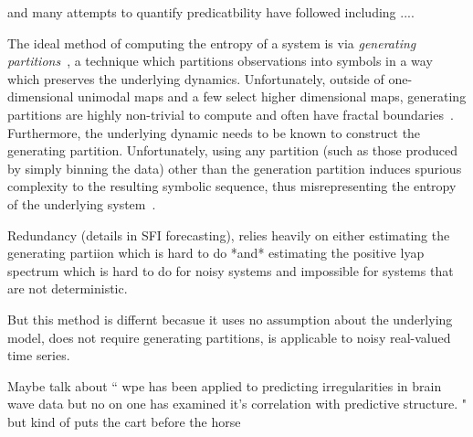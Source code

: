  and many attempts to quantify predicatbility have followed including ....

The ideal method of computing the entropy of a system is via \emph{generating partitions}~\cite{lind95}, a technique which partitions observations into symbols in a way which preserves the underlying dynamics. Unfortunately, outside of one-dimensional unimodal maps and a few select higher dimensional maps, generating partitions are highly non-trivial to compute and often have fractal boundaries~\cite{eisele1999}. Furthermore, the underlying dynamic needs to be known to construct the generating partition. Unfortunately, using any partition (such as those produced by simply binning the data) other than the generation partition induces spurious complexity to the resulting symbolic sequence, thus misrepresenting the entropy of the underlying system~\cite{bollt2001}.


Redundancy (details in SFI forecasting), relies heavily on either estimating the generating partiion which is hard to do *and* estimating the positive lyap spectrum which is hard to do for noisy systems and impossible for systems that are not deterministic.



But this method is differnt becasue it uses no assumption about the underlying model, does not require generating partitions, is applicable to noisy real-valued time series.


Maybe talk about ``
wpe has been applied to predicting irregularities in brain wave data but no on one has examined it's correlation with predictive structure. "
but kind of puts the cart before the horse


